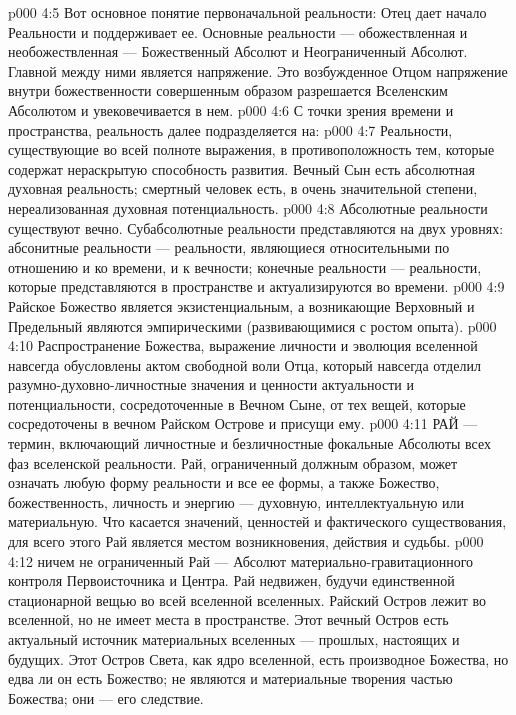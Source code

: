\vs p000 4:5 Вот основное понятие первоначальной реальности: Отец дает начало Реальности и поддерживает ее. Основные  реальности --- обожествленная и необожествленная --- Божественный Абсолют и Неограниченный Абсолют. Главной  между ними является напряжение. Это возбужденное Отцом напряжение внутри божественности совершенным образом разрешается Вселенским Абсолютом и увековечивается в нем.
\vs p000 4:6 \pc С точки зрения времени и пространства, реальность далее подразделяется на:
\vs p000 4:7 \bibnobreakspace {} Реальности, существующие во всей полноте выражения, в противоположность тем, которые содержат нераскрытую способность развития. Вечный Сын есть абсолютная духовная реальность; смертный человек есть, в очень значительной степени, нереализованная духовная потенциальность.
\vs p000 4:8 \bibnobreakspace {} Абсолютные реальности существуют вечно. Субабсолютные реальности представляются на двух уровнях: абсонитные реальности --- реальности, являющиеся относительными по отношению и ко времени, и к вечности; конечные реальности --- реальности, которые представляются в пространстве и актуализируются во времени.
\vs p000 4:9 \bibnobreakspace {} Райское Божество является экзистенциальным, а возникающие Верховный и Предельный являются эмпирическими (развивающимися с ростом опыта).
\vs p000 4:10 \bibnobreakspace {} Распространение Божества, выражение личности и эволюция вселенной навсегда обусловлены актом свободной воли Отца, который навсегда отделил разумно\hyp{}духовно\hyp{}личностные значения и ценности актуальности и потенциальности, сосредоточенные в Вечном Сыне, от тех вещей, которые сосредоточены в вечном Райском Острове и присущи ему.
\vs p000 4:11 \pc РАЙ --- термин, включающий личностные и безличностные фокальные Абсолюты всех фаз вселенской реальности. Рай, ограниченный должным образом, может означать любую форму реальности и все ее формы, а также Божество, божественность, личность и энергию --- духовную, интеллектуальную или материальную. Что касается значений, ценностей и фактического существования, для всего этого Рай является местом возникновения, действия и судьбы.
\vs p000 4:12 \pc {} ничем не ограниченный Рай --- Абсолют материально\hyp{}гравитационного контроля Первоисточника и Центра. Рай недвижен, будучи единственной стационарной вещью во всей вселенной вселенных. Райский Остров лежит во вселенной, но не имеет места в пространстве. Этот вечный Остров есть актуальный источник материальных вселенных --- прошлых, настоящих и будущих. Этот Остров Света, как ядро вселенной, есть производное Божества, но едва ли он есть Божество; не являются и материальные творения частью Божества; они --- его следствие.
